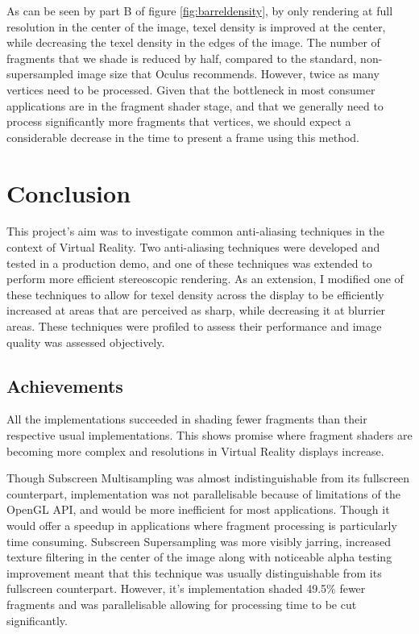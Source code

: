\documentclass[12pt,a4paper,twoside,openright]{report}
\begin{document}
As can be seen by part B of figure \ref{fig:barreldensity}, by only rendering at full resolution in the center of the image, texel density is improved at the center, while decreasing the texel density in the edges of the image. The number of fragments that we shade is reduced by half, compared to the standard, non-supersampled image size that Oculus recommends. However, twice as many vertices need to be processed. Given that the bottleneck in most consumer applications are in the fragment shader stage, and that we generally need to process significantly more fragments that vertices, we should expect a considerable decrease in the time to present a frame using this method. 


\chapter{Conclusion}

This project's aim was to investigate common anti-aliasing techniques in the context of Virtual Reality. Two anti-aliasing techniques were developed and tested in a production demo, and one of these techniques was extended to perform more efficient stereoscopic rendering. As an extension, I modified one of these techniques to allow for texel density across the display to be efficiently increased at areas that are perceived as sharp, while decreasing it at blurrier areas. These techniques were profiled to assess their performance and image quality was assessed objectively.  

\section{Achievements}

All the implementations succeeded in shading fewer fragments than their respective usual implementations.
This shows promise where fragment shaders are becoming more complex and resolutions in Virtual Reality displays increase. \par

Though Subscreen Multisampling was almost indistinguishable from its fullscreen counterpart, implementation was not parallelisable because of limitations of the OpenGL API, and would be more inefficient for most applications. Though it would offer a speedup in applications where fragment processing is particularly time consuming.
Subscreen Supersampling was more visibly jarring, increased texture filtering in the center of the image along with noticeable alpha testing improvement meant that this technique was usually distinguishable from its fullscreen counterpart.
However, it's implementation shaded 49.5\% fewer fragments and was parallelisable allowing for processing time to be cut significantly. \par
\end{document}
